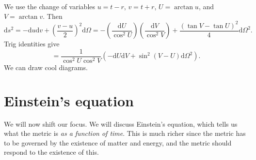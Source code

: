 
We use the change of variables $u=t-r$, $v=t+r$, $U=\arctan u$, and $V=\arctan v$. Then
\[
	\mathrm{d} s^2=-\mathrm{d} u\mathrm{d} v+\left( \frac{v-u}{2}  \right) ^2\mathrm{d} \Omega =-\left( \frac{\mathrm{d} U}{ \cos ^2U} \right) \left( \frac{\mathrm{d} V}{\cos ^2V}  \right) +\frac{\left( \tan V-\tan U \right) ^2}{4} \mathrm{d} \Omega ^2
.\]
Trig identities give
\[
	=\frac{1}{\cos ^2U \cos ^2V} \left( -\mathrm{d} U\mathrm{d} V+\sin ^2(V-U)\mathrm{d} \Omega ^2 \right) 
.\]
We can draw cool diagrams.

\chapter{Einstein's equation}

We will now shift our focus. We will discuss Einstein's equation, which tells us what the metric is \emph{as a function of time}. This is much richer since the metric has to be governed by the existence of matter and energy, and the metric should respond to the existence of this.
